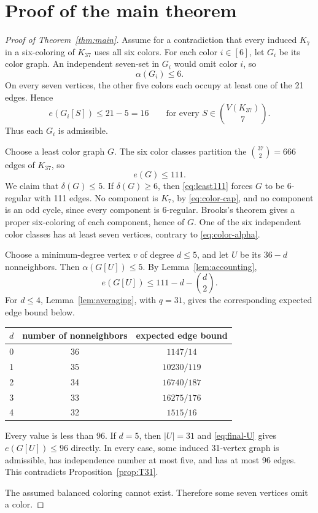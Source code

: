 \documentclass[11pt,reqno,a4paper]{amsart}
\theoremstyle{definition}
\theoremstyle{remark}
\begin{document}
\section{Proof of the main theorem}

\begin{proof}[Proof of Theorem~\ref{thm:main}]
Assume for a contradiction that every induced $K_7$ in a six-coloring of
$K_{37}$ uses all six colors.  For each color $i\in[6]$, let $G_i$ be its
color graph.  An independent seven-set in $G_i$ would omit color $i$, so
\begin{equation}\label{eq:color-alpha}
  \alpha(G_i)\leq6.
\end{equation}
On every seven vertices, the other five colors each occupy at least one of
the 21 edges.  Hence
\begin{equation}\label{eq:color-cap}
  e(G_i[S])\leq21-5=16
  \qquad\text{for every }S\in\binom{V(K_{37})}7.
\end{equation}
Thus each $G_i$ is admissible.

Choose a least color graph $G$.  The six color classes partition the
$\binom{37}{2}=666$ edges of $K_{37}$, so
\begin{equation}\label{eq:least111}
  e(G)\leq111.
\end{equation}
We claim that $\delta(G)\leq5$.  If $\delta(G)\geq6$, then
\eqref{eq:least111} forces $G$ to be 6-regular with 111 edges.  No component
is $K_7$, by \eqref{eq:color-cap}, and no component is an odd cycle, since
every component is 6-regular.  Brooks's theorem gives a proper six-coloring
of each component, hence of $G$.  One of the six independent color classes
has at least seven vertices, contrary to \eqref{eq:color-alpha}.

Choose a minimum-degree vertex $v$ of degree $d\leq5$, and let $U$ be its
$36-d$ nonneighbors.  Then $\alpha(G[U])\leq5$.  By
Lemma~\ref{lem:accounting},
\begin{equation}\label{eq:final-U}
  e(G[U])\leq111-d-\binom d2.
\end{equation}
For $d\leq4$, Lemma~\ref{lem:averaging}, with $q=31$, gives the
corresponding expected edge bound below.
\begin{center}
\begin{tabular}{c@{\qquad}c@{\qquad}c}
\toprule
$d$ & number of nonneighbors & expected edge bound\\
\midrule
0 & 36 & $1147/14$\\
1 & 35 & $10230/119$\\
2 & 34 & $16740/187$\\
3 & 33 & $16275/176$\\
4 & 32 & $1515/16$\\
\bottomrule
\end{tabular}
\end{center}
Every value is less than 96.  If $d=5$, then $|U|=31$ and
\eqref{eq:final-U} gives $e(G[U])\leq96$ directly.  In every case, some
induced 31-vertex graph is admissible, has independence number at most five,
and has at most 96 edges.  This contradicts Proposition~\ref{prop:T31}.

The assumed balanced coloring cannot exist.  Therefore some seven vertices
omit a color.
\end{proof}

\enlargethispage{3\baselineskip}


\end{document}
